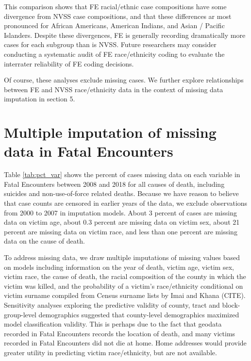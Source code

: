 \documentclass{article}
\begin{document}
This comparison shows that FE racial/ethnic case compositions have some divergence from NVSS case compositions, and that these differences ar most pronounced for African Americans, American Indians, and Asian / Pacific Islanders. Despite these divergences, FE is generally recording dramatically more cases for each subgroup than is NVSS. Future researchers may consider conducting a systematic audit of FE race/ethnicity coding to evaluate the interrater reliability of FE coding decisions.

Of course, these analyses exclude missing cases. We further explore relationships between FE and NVSS race/ethnicity data in the context of missing data imputation in section 5. 

\section{Multiple imputation of missing data in Fatal Encounters}

Table \ref{tab:pct_var} shows the percent of cases missing data on each variable in Fatal Encounters between 2008 and 2018 for all causes of death, including suicides and non-use-of-force related deaths. Because we have reason to believe that case counts are censored in earlier years of the data, we exclude observations from 2000 to 2007 in imputation models. About 3 percent of cases are missing data on victim age, about 0.3 percent are missing data on victim sex, about 21 percent are missing data on victim race, and less than one percent are missing data on the cause of death. 



To address missing data, we draw multiple imputations of missing values based on models including information on the year of death, victim age, victim sex, victim race, the cause of death, the racial composition of the county in which the victim was killed, and the probability of a victim's race/ethnicity conditional on victim surname compiled from Census surname lists by Imai and Khana (CITE). Sensitivity analyses exploring the predictive validity of county, tract and block-group-level demographics suggested that county-level demographics maximized model classification validity. This is perhaps due to the fact that geodata recorded in Fatal Encounters records the location of death, and many victims recorded in Fatal Encounters did not die at home. Home addresses would provide greater utility in predicting victim race/ethnicity, but are not available. 
\end{document}
